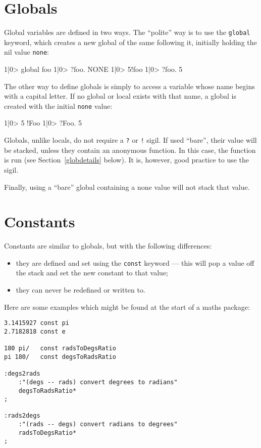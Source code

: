 \section{Globals}
Global variables are defined in two ways. The ``polite'' way is to use the 
\texttt{global} keyword, which creates a new global of the same following
it, initially holding the nil value \texttt{none}:
\begin{v}
1|0> global foo
1|0> ?foo.
NONE
1|0> 5!foo
1|0> ?foo.
5
\end{v}
The other way to define globals is simply to access a variable whose
name begins with a capital letter. If no global or local exists with that
name, a global is created with the initial \texttt{none} value:
\begin{v}
1|0> 5 !Foo
1|0> ?Foo.
5
\end{v}
Globals, unlike locals, do not require a \texttt{?} or \texttt{!} sigil.
If used ``bare'', their value will be stacked, unless they contain
an anonymous function. In this case, the function is run (see
Section~\ref{globdetails} below). It is, however, good practice to use
the sigil.

Finally, using a ``bare'' global containing a none value will not stack
that value.

\section{Constants}
Constants are similar to globals, but with the following differences:
\begin{itemize}
\item they are defined and set using the \texttt{const} keyword ---
this will pop a value off the stack and set the new constant to that value;
\item they can never be redefined or written to.
\end{itemize}
Here are some examples which might be found at the start of a maths
package:
\begin{lstlisting}
3.1415927 const pi
2.7182818 const e

180 pi/   const radsToDegsRatio
pi 180/   const degsToRadsRatio

:degs2rads
    :"(degs -- rads) convert degrees to radians"
    degsToRadsRatio*
;

:rads2degs
    :"(rads -- degs) convert radians to degrees"
    radsToDegsRatio*
;
\end{lstlisting}

